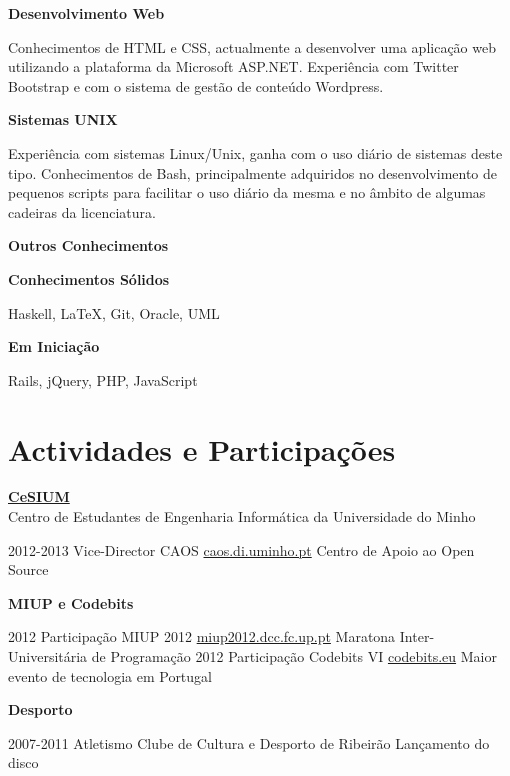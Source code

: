 \documentclass[]{friggeri-cv}
\begin{document}
\textbf{\large Desenvolvimento Web}

Conhecimentos de HTML e CSS, actualmente a desenvolver uma aplicação web 
utilizando a plataforma da Microsoft ASP.NET.
Experiência com Twitter Bootstrap e com o sistema de gestão de conteúdo Wordpress.

\newpage
\textbf{\large Sistemas UNIX}

Experiência com sistemas Linux/Unix, ganha com o uso diário de sistemas deste tipo.
Conhecimentos de Bash, principalmente adquiridos no desenvolvimento de pequenos scripts 
para facilitar o uso diário da mesma e no âmbito de algumas cadeiras da licenciatura.

\textbf{\large Outros Conhecimentos}

\textbf{Conhecimentos Sólidos}

Haskell, \LaTeX, Git, Oracle, UML

\textbf{Em Iniciação}

Rails, jQuery, PHP, JavaScript
\\
\section{Actividades e Participações}

\textbf{\LARGE \href{http://www.cesium.di.uminho.pt/}{CeSIUM}} 
\\Centro de Estudantes de Engenharia Informática da Universidade do Minho

\begin{entrylist}
  \entry
    {2012-2013}
    {Vice-Director CAOS}
    {\href{http://caos.di.uminho.pt/}{caos.di.uminho.pt}} 
    {Centro de Apoio ao Open Source}
\end{entrylist}

\textbf{\LARGE MIUP e Codebits} 

\begin{entrylist}
  \entry
    {2012}
    {Participação MIUP 2012}
    {\href{http://miup2012.dcc.fc.up.pt/}{miup2012.dcc.fc.up.pt}} 
    {Maratona Inter-Universitária de Programação}
  \entry
    {2012}
    {Participação Codebits VI}
    {\href{https://codebits.eu/}{codebits.eu}} 
    {Maior evento de tecnologia em Portugal}
\end{entrylist}

\textbf{\LARGE Desporto} 

\begin{entrylist}
  \entry
    {2007-2011}
    {Atletismo}
    {Clube de Cultura e Desporto de Ribeirão} 
    {Lançamento do disco}
\end{entrylist}
\end{document}
